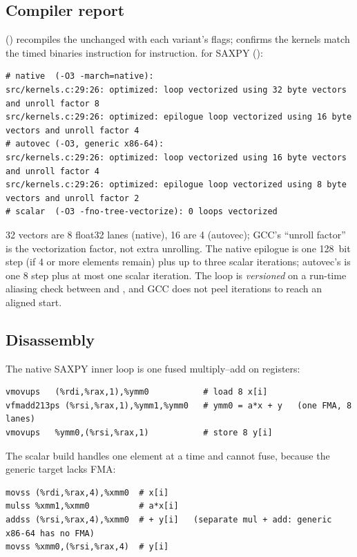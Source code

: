 \subsection{Compiler report}
 () recompiles the unchanged
 with each variant's flags;  confirms the kernels match the timed
binaries instruction for instruction.  for SAXPY ():
\begin{lstlisting}[style=excerpt]
# native  (-O3 -march=native):
src/kernels.c:29:26: optimized: loop vectorized using 32 byte vectors and unroll factor 8
src/kernels.c:29:26: optimized: epilogue loop vectorized using 16 byte vectors and unroll factor 4
# autovec (-O3, generic x86-64):
src/kernels.c:29:26: optimized: loop vectorized using 16 byte vectors and unroll factor 4
src/kernels.c:29:26: optimized: epilogue loop vectorized using 8 byte vectors and unroll factor 2
# scalar  (-O3 -fno-tree-vectorize): 0 loops vectorized
\end{lstlisting}
\qty{32}{\byte} vectors are \num{8} float32 lanes (native), \qty{16}{\byte} are \num{4} (autovec);
GCC's ``unroll factor'' is the vectorization factor, not extra unrolling. The native epilogue is one
\qty{128}{bit} step (if \num{4} or more elements remain) plus up to three scalar iterations;
autovec's is one \qty{8}{\byte} step plus at most one scalar iteration. The loop is
\emph{versioned} on a run-time aliasing check between  and , and GCC does not peel
iterations to reach an aligned start.

\subsection{Disassembly}
The native SAXPY inner loop is one fused multiply--add on  registers:
\begin{lstlisting}[style=excerpt]
vmovups   (%rdi,%rax,1),%ymm0           # load 8 x[i]
vfmadd213ps (%rsi,%rax,1),%ymm1,%ymm0   # ymm0 = a*x + y   (one FMA, 8 lanes)
vmovups   %ymm0,(%rsi,%rax,1)           # store 8 y[i]
\end{lstlisting}
The scalar build handles one element at a time and cannot fuse, because the generic 
target lacks FMA:
\begin{lstlisting}[style=excerpt]
movss (%rdi,%rax,4),%xmm0  # x[i]
mulss %xmm1,%xmm0          # a*x[i]
addss (%rsi,%rax,4),%xmm0  # + y[i]   (separate mul + add: generic x86-64 has no FMA)
movss %xmm0,(%rsi,%rax,4)  # y[i]
\end{lstlisting}

